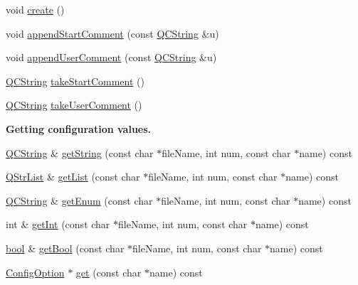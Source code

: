 \begin{DoxyCompactItemize}
\item 
void \hyperlink{class_config_a648a61e504c9f71dd1e568c85e5c41c1}{create} ()
\item 
void \hyperlink{class_config_a410d5a466e3ad703bca259fba168000d}{append\+Start\+Comment} (const \hyperlink{class_q_c_string}{Q\+C\+String} \&u)
\item 
void \hyperlink{class_config_a3545a504bca96d2b17f2f15d2ad7e501}{append\+User\+Comment} (const \hyperlink{class_q_c_string}{Q\+C\+String} \&u)
\item 
\hyperlink{class_q_c_string}{Q\+C\+String} \hyperlink{class_config_a67be2b3afe42fb390e59dbecfbdadcee}{take\+Start\+Comment} ()
\item 
\hyperlink{class_q_c_string}{Q\+C\+String} \hyperlink{class_config_a6ecb2d94f351474c1e80665df55bf686}{take\+User\+Comment} ()
\end{DoxyCompactItemize}
\begin{Indent}{\bf Getting configuration values.}\par
\begin{DoxyCompactItemize}
\item 
\hyperlink{class_q_c_string}{Q\+C\+String} \& \hyperlink{class_config_a35a9b90dc0ce6e72cafa2b4084fb04ac}{get\+String} (const char $\ast$file\+Name, int num, const char $\ast$name) const 
\item 
\hyperlink{class_q_str_list}{Q\+Str\+List} \& \hyperlink{class_config_a922b44d8f8b66a51e9ba99d903e4dc0c}{get\+List} (const char $\ast$file\+Name, int num, const char $\ast$name) const 
\item 
\hyperlink{class_q_c_string}{Q\+C\+String} \& \hyperlink{class_config_ac012536fef6273be0888a7b1bf75b47c}{get\+Enum} (const char $\ast$file\+Name, int num, const char $\ast$name) const 
\item 
int \& \hyperlink{class_config_acf924166305d2134cccf782c04a55bf2}{get\+Int} (const char $\ast$file\+Name, int num, const char $\ast$name) const 
\item 
\hyperlink{qglobal_8h_a1062901a7428fdd9c7f180f5e01ea056}{bool} \& \hyperlink{class_config_ab9ccfc102f3e95c5fcc2cdab6c8f9b59}{get\+Bool} (const char $\ast$file\+Name, int num, const char $\ast$name) const 
\item 
\hyperlink{class_config_option}{Config\+Option} $\ast$ \hyperlink{class_config_ad26b37b110cae51fa88b99bfdccc6a89}{get} (const char $\ast$name) const 
\end{DoxyCompactItemize}
\end{Indent}
